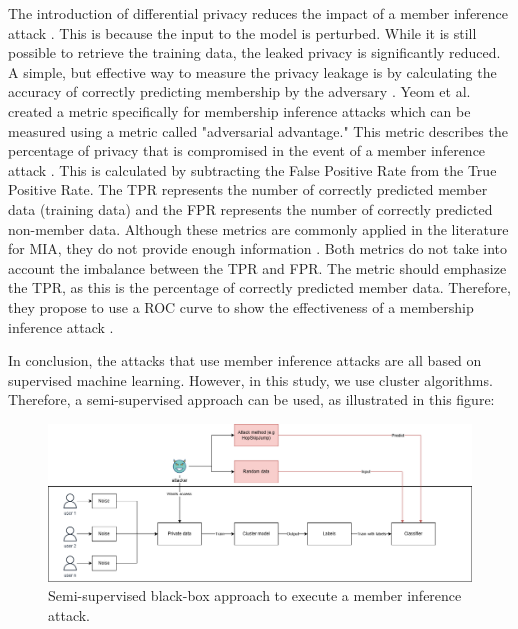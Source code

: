 The introduction of differential privacy reduces the impact of a member inference attack \citep{rigaki_survey_2021,hu_membership_2022}.
This is because the input to the model is perturbed. While it is still possible to retrieve the training data, the leaked privacy is significantly reduced.
A simple, but effective way to measure the privacy leakage is by calculating the accuracy of correctly predicting membership by the adversary \citep{choquette-choo_label-only_2021}.
Yeom et al. created a metric specifically for membership inference attacks which can be measured using a metric called "adversarial advantage."
This metric describes the percentage of privacy that is compromised in the event of a member inference attack \citep{yeom_privacy_2018}.
This is calculated by subtracting the False Positive Rate from the True Positive Rate.
The TPR represents the number of correctly predicted member data (training data) and the FPR represents the number of correctly predicted non-member data.
Although these metrics are commonly applied in the literature for MIA, they do not provide enough information \citep{carlini_membership_2022}.
Both metrics do not take into account the imbalance between the TPR and FPR.
The metric should emphasize the TPR, as this is the percentage of correctly predicted member data.
Therefore, they propose to use a ROC curve to show the effectiveness of a membership inference attack \citep{carlini_membership_2022}. \newline

In conclusion, the attacks that use member inference attacks are all based on supervised machine learning.
However, in this study, we use cluster algorithms.
Therefore, a semi-supervised approach can be used, as illustrated in this figure:

\begin{figure}[h]
  \includegraphics[width=1\textwidth]{TheorethicalFramework/Differential privacy/master-thesis-MIA.png}
  \caption{Semi-supervised black-box approach to execute a member inference attack.}
  \label{figure:MIA-semi-supervised}
\end{figure}
